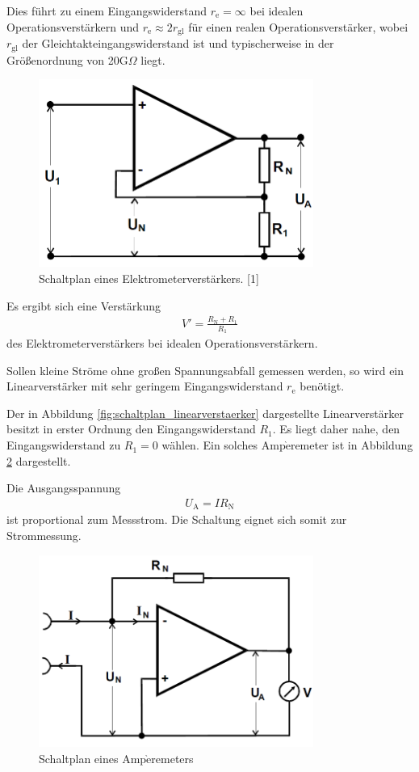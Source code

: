\documentclass[]{scrartcl}
\begin{document}
Dies führt zu einem Eingangswiderstand $r_\text{e}=\infty$ bei idealen Operationsverstärkern und $r_\text{e}\approx 2r_{\text{gl}}$ für einen realen Operationsverstärker, wobei $r_{\text{gl}}$ der Gleichtakteingangswiderstand ist und typischerweise in der Größenordnung von 20G$\Omega$ liegt.
\begin{figure}[H]
\centering
\includegraphics[width=9cm]{images/schaltplan_elektrometerverstaerker.png}
\caption{Schaltplan eines Elektrometerverstärkers. [1]}
\label{fig:schaltplan_elektrometerverstaerker}
\end{figure}
Es ergibt sich eine Verstärkung
\begin{align}
V'=\frac{R_\text{N}+R_1}{R_1}
\end{align}
des Elektrometerverstärkers bei idealen Operationsverstärkern.

Sollen kleine Ströme ohne großen Spannungsabfall gemessen werden, so wird ein Linearverstärker mit sehr geringem Eingangswiderstand $r_\text{e}$ benötigt. 

Der in Abbildung \ref{fig:schaltplan_linearverstaerker} dargestellte Linearverstärker besitzt in erster Ordnung den Eingangswiderstand $R_1$. Es liegt daher nahe, den Eingangswiderstand zu $R_1=0$ wählen. Ein solches Amp$\grave{\text{e}}$remeter ist in Abbildung \ref{fig:schaltplan_amperemeter} dargestellt.

Die Ausgangsspannung 
\begin{align}
U_\text{A}=IR_\text{N}
\end{align}
ist proportional zum Messstrom. Die Schaltung eignet sich somit zur Strommessung.
\begin{figure}[H]
\centering
\includegraphics[width=9cm]{images/schaltplan_amperemeter.png}
\caption{Schaltplan eines Amp$\grave{\text{e}}$remeters}
\label{fig:schaltplan_amperemeter}
\end{figure}
\end{document}
